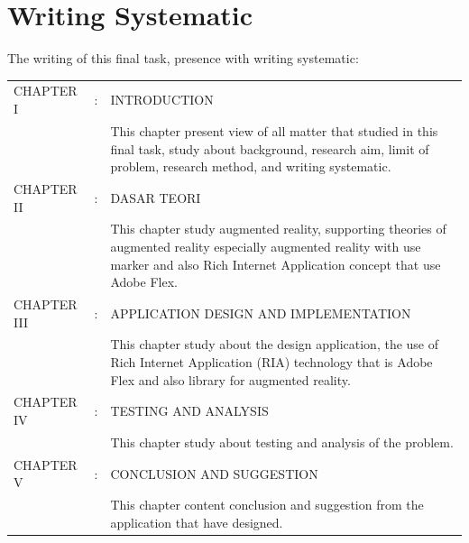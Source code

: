 \documentclass[12pt,a4paper,pdftex,final,oneside,titlepage]{book}
\begin{document}
\section{Writing Systematic}
\label{sec:sistematika_penulisan}
The writing of this final task, presence with writing systematic:
\par\noindent
\begin{longtable}{llp{11cm}}
CHAPTER I & : & INTRODUCTION\\
& & This chapter present view of all matter that studied in this final task, study about background, research aim, limit of problem, research method, and writing systematic.\\
CHAPTER II & : & DASAR TEORI\\
& & This chapter study augmented reality, supporting theories of augmented reality especially augmented reality with use marker and also Rich Internet Application concept that use Adobe Flex.\\
CHAPTER III & : & APPLICATION DESIGN AND IMPLEMENTATION\\
& & This chapter study about the design application, the use of Rich Internet Application (RIA) technology that is Adobe Flex and also library for augmented reality.\\
CHAPTER IV & : & TESTING AND ANALYSIS\\
& & This chapter study about testing and analysis of the problem.\\

CHAPTER V & : & CONCLUSION AND SUGGESTION\\
& & This chapter content conclusion and suggestion from the application that have designed.

\end{longtable}
%


%
%

\renewcommand{\bibname}{Daftar Pustaka}
 

\end{document}
